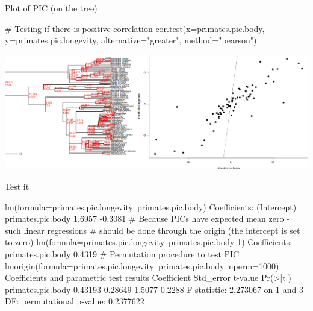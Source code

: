\documentclass[compress, ucs, xelatex, 11pt, xcolor=svgnames, aspectratio=169,
	hyperref={
		bookmarks=true,
		unicode=true,
		colorlinks=true,
		pdftitle={Molecular data in R},
		plainpages=false,
		pdfauthor={Vojtech Zeisek},
		pdfsubject={Course about phylogeny and evolution in R},
		pdfcreator={XeLaTeX},
		pdfkeywords={R, evolution, phylogeny, molecular data},
		linkcolor=Crimson, %
		anchorcolor=Magenta, %
		citecolor=Magenta, %
		filecolor=Magenta, %
		menucolor=Magenta, %
		urlcolor=DodgerBlue, %
		pdftex},
	url={hyphens, lowtilde} %
	]{beamer}
\begin{document}
\begin{frame}[fragile]{Plot of PIC (on the tree)}
	\begin{spluscode}
    # Testing if there is positive correlation
    cor.test(x=primates.pic.body, y=primates.pic.longevity,
      alternative="greater", method="pearson")
	\end{spluscode}
	\begin{center}
		\includegraphics[width=\textwidth-5cm]{pic.png}
	\end{center}
\end{frame}

\begin{frame}[fragile]{Test it}
	\label{pic-test}
	\begin{spluscode}
    lm(formula=primates.pic.longevity~primates.pic.body)
    Coefficients:
      (Intercept)  primates.pic.body
           1.6957            -0.3081
    # Because PICs have expected mean zero - such linear regressions
    # should be done through the origin (the intercept is set to zero)
    lm(formula=primates.pic.longevity~primates.pic.body-1)
    Coefficients:
    primates.pic.body
               0.4319
    # Permutation procedure to test PIC
    lmorigin(formula=primates.pic.longevity~primates.pic.body, nperm=1000)
    Coefficients and parametric test results
                       Coefficient Std_error t-value Pr(>|t|)
    primates.pic.body     0.43193   0.28649  1.5077   0.2288
    F-statistic: 2.273067 on 1 and 3 DF:
      permutational p-value: 0.2377622
	\end{spluscode}
\end{frame}
\end{document}

